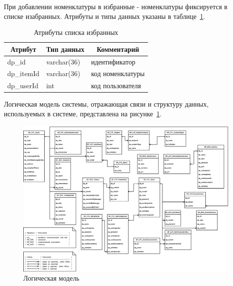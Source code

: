 При добавлении номенклатуры в избранные - номенклатуры фиксируется в списке изабранных.
Атрибуты и типы данных указаны в таблице~\ref{tab:DP_LST_FavoriteItems}.

\begin{table}[!htb]
    \centering\small

    \caption{Атрибуты списка избранных}
    \label{tab:DP_LST_FavoriteItems}

    \begin{tabular}{|p{5cm}|p{2.5cm}|p{9cm}|}
        \hline
        \multicolumn{1}{|c|}{Атрибут}
        & \multicolumn{1}{c|}{Тип данных}
        & \multicolumn{1}{c|}{Комментарий}
        \\ \hline

        dp\_id & varchar(36) & идентификатор \\ \hline
        dp\_itemId & varchar(36) & код номенклатуры \\ \hline
        dp\_userId & int & код пользователя \\ \hline
    \end{tabular}
\end{table}

Логическая модель системы, отражающая связи и структуру данных,
используемых в системе,
представлена на рисунке~\ref{fig:db_logic_model}.



\begin{figure}[!p]
    \centering

    \includegraphics[angle=90, width=18cm]
    {images/db/db.png}

    \caption{Логическая модель}

    \label{fig:db_logic_model}
\end{figure}
